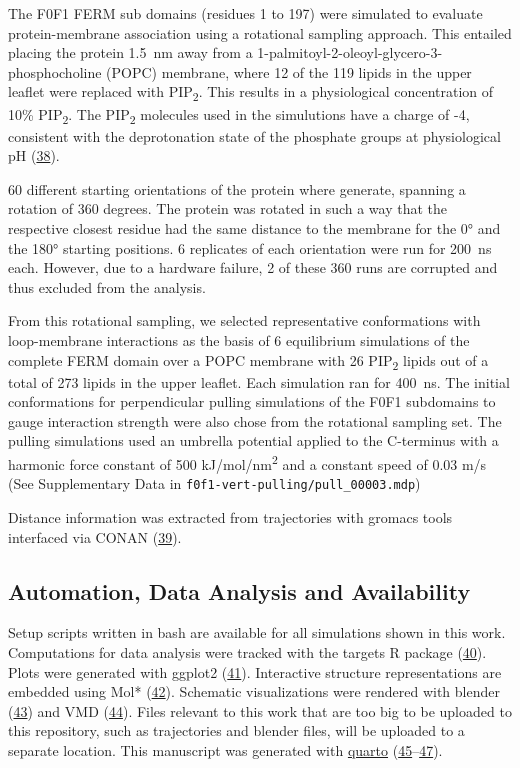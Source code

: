 \documentclass[
  twocolumn]{biophys-new-mod}
\begin{document}
The F0F1 FERM sub domains (residues 1 to 197) were simulated to evaluate
protein-membrane association using a rotational sampling approach. This
entailed placing the protein 1.5~nm away from a
1-palmitoyl-2-oleoyl-glycero-3-phosphocholine (POPC) membrane, where 12
of the 119 lipids in the upper leaflet were replaced with
PIP\textsubscript{2}. This results in a physiological concentration of
10\% PIP\textsubscript{2}. The PIP\textsubscript{2} molecules used in
the simulutions have a charge of -4, consistent with the deprotonation
state of the phosphate groups at physiological pH
(\protect\hyperlink{ref-mclaughlinPIP2ProteinsInteractions2002}{38}).

60 different starting orientations of the protein where generate,
spanning a rotation of 360 degrees. The protein was rotated in such a
way that the respective closest residue had the same distance to the
membrane for the 0° and the 180° starting positions. 6 replicates of
each orientation were run for 200~ns each. However, due to a hardware
failure, 2 of these 360 runs are corrupted and thus excluded from the
analysis.

From this rotational sampling, we selected representative conformations
with loop-membrane interactions as the basis of 6 equilibrium
simulations of the complete FERM domain over a POPC membrane with 26
PIP\textsubscript{2} lipids out of a total of 273 lipids in the upper
leaflet. Each simulation ran for 400~ns. The initial conformations for
perpendicular pulling simulations of the F0F1 subdomains to gauge
interaction strength were also chose from the rotational sampling set.
The pulling simulations used an umbrella potential applied to the
C-terminus with a harmonic force constant of 500
kJ/mol/nm\textsuperscript{2} and a constant speed of 0.03 m/s (See
Supplementary Data in \texttt{f0f1-vert-pulling/pull\_00003.mdp})

Distance information was extracted from trajectories with gromacs tools
interfaced via CONAN
(\protect\hyperlink{ref-mercadanteCONANToolDecode2018}{39}).

\hypertarget{automation-data-analysis-and-availability}{%
\subsection{Automation, Data Analysis and
Availability}\label{automation-data-analysis-and-availability}}

Setup scripts written in bash are available for all simulations shown in
this work. Computations for data analysis were tracked with the targets
R package (\protect\hyperlink{ref-landauTargetsPackageDynamic2021}{40}).
Plots were generated with ggplot2 (\protect\hyperlink{ref-ggplot}{41}).
Interactive structure representations are embedded using Mol*
(\protect\hyperlink{ref-molstar}{42}). Schematic visualizations were
rendered with blender (\protect\hyperlink{ref-blender}{43}) and VMD
(\protect\hyperlink{ref-vmd}{44}). Files relevant to this work that are
too big to be uploaded to this repository, such as trajectories and
blender files, will be uploaded to a separate location. This manuscript
was generated with \href{https://quarto.org/}{quarto}
(\protect\hyperlink{ref-quarto}{45}--\protect\hyperlink{ref-rbetterposter}{47}).
\end{document}
